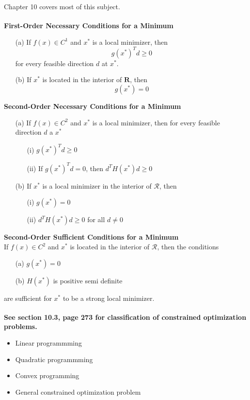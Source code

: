 \documentclass[12pt,a4paper]{report}
\begin{document}
Chapter 10 covers most of this subject.
\\\\
\textbf{First-Order Necessary Conditions for a Minimum}
\begin{itemize}
\item[(a)] If $f(x)\in C^1$ and $x^*$ is a local minimizer, then
\begin{equation}
g(x^*)^T d \geq 0
\end{equation}
for every feasible direction $d$ at $x^*$.
\item[(b)] If $x^*$ is located in the interior of $\mathbf{R}$, then
\begin{equation}
g(x^*)=0
\end{equation}
\end{itemize}
\textbf{Second-Order Necessary Conditions for a Minimum}
\begin{itemize}
\item[(a)] If $f(x)\in C^2$ and $x^*$ is a local minimizer, then for every feasible direction $d$ a $x^*$
\begin{itemize}
\item[(i)] $g(x^*)^Td \geq 0$
\item[(ii)] If $g(x^*)^Td=0$, then $d^TH(x^*)d\geq0$
\end{itemize}
\item[(b)] If $x^*$ is a local minimizer in the interior of $\mathcal{R}$, then
\begin{itemize}
\item[(i)] $g(x^*)=0$
\item[(ii)] $d^TH(x^*)d\geq0$ for all $d\neq0$
\end{itemize}
\end{itemize}
\textbf{Second-Order Sufficient Conditions for a Minimum}\\
If $f(x)\in C^2$ and $x^*$ is located in the interior of $\mathcal{R}$, then the conditions
\begin{itemize}
\item[(a)] $g(x^*)=0$
\item[(b)] $H(x^*)$ is positive semi definite
\end{itemize}
are sufficient for $x^*$ to be a strong local minimizer.
\\\\
\textbf{See section 10.3, page 273 for classification of constrained optimization problems.}
\begin{itemize}
\setlength\itemsep{0em}
\item Linear programmming
\item Quadratic programmming
\item Convex programming
\item General constrained optimization problem
\end{itemize}
\end{document}

